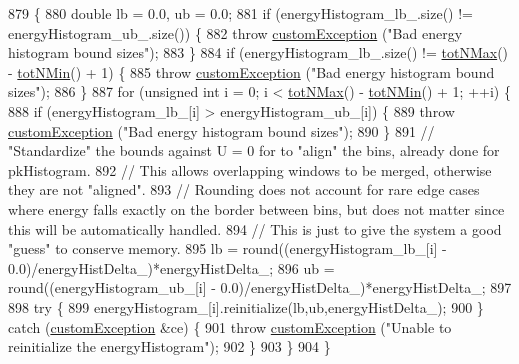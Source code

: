 \begin{DoxyCode}
879                                              \{
880     \textcolor{keywordtype}{double} lb = 0.0, ub = 0.0;
881     \textcolor{keywordflow}{if} (energyHistogram\_lb\_.size() != energyHistogram\_ub\_.size()) \{
882         \textcolor{keywordflow}{throw} \hyperlink{classcustom_exception}{customException} (\textcolor{stringliteral}{"Bad energy histogram bound sizes"});
883     \}
884     \textcolor{keywordflow}{if} (energyHistogram\_lb\_.size() != \hyperlink{classsim_system_aee2c65ecb43a35c0c4d070cdb45f7dc0}{totNMax}() - \hyperlink{classsim_system_af10842e0eaa638373b8717c87b47e6bc}{totNMin}() + 1) \{
885         \textcolor{keywordflow}{throw} \hyperlink{classcustom_exception}{customException} (\textcolor{stringliteral}{"Bad energy histogram bound sizes"});
886     \}
887     \textcolor{keywordflow}{for} (\textcolor{keywordtype}{unsigned} \textcolor{keywordtype}{int} i = 0; i < \hyperlink{classsim_system_aee2c65ecb43a35c0c4d070cdb45f7dc0}{totNMax}() - \hyperlink{classsim_system_af10842e0eaa638373b8717c87b47e6bc}{totNMin}() + 1; ++i) \{
888         \textcolor{keywordflow}{if} (energyHistogram\_lb\_[i] > energyHistogram\_ub\_[i]) \{
889             \textcolor{keywordflow}{throw} \hyperlink{classcustom_exception}{customException} (\textcolor{stringliteral}{"Bad energy histogram bound sizes"});
890         \}
891         \textcolor{comment}{// "Standardize" the bounds against U = 0 for to "align" the bins, already done for pkHistogram.}
892         \textcolor{comment}{// This allows overlapping windows to be merged, otherwise they are not "aligned".}
893         \textcolor{comment}{// Rounding does not account for rare edge cases where energy falls exactly on the border between
       bins, but does not matter since this will be automatically handled.}
894         \textcolor{comment}{// This is just to give the system a good "guess" to conserve memory.}
895         lb = round((energyHistogram\_lb\_[i] - 0.0)/energyHistDelta\_)*energyHistDelta\_;
896         ub = round((energyHistogram\_ub\_[i] - 0.0)/energyHistDelta\_)*energyHistDelta\_;
897 
898         \textcolor{keywordflow}{try} \{
899             energyHistogram\_[i].reinitialize(lb,ub,energyHistDelta\_);
900         \} \textcolor{keywordflow}{catch} (\hyperlink{classcustom_exception}{customException} &ce) \{
901             \textcolor{keywordflow}{throw} \hyperlink{classcustom_exception}{customException} (\textcolor{stringliteral}{"Unable to reinitialize the energyHistogram"});
902         \}
903     \}
904 \}
\end{DoxyCode}
